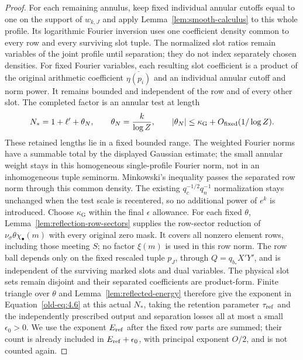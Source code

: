 \begin{proof}
For each remaining annulus, keep fixed individual annular cutoffs equal to
one on the support of $w_{k,J}$ and apply
Lemma~\ref{lem:smooth-calculus} to this whole profile.  Its logarithmic
Fourier inversion uses one coefficient density common to every row and
every surviving slot tuple.  The normalized slot ratios remain variables
of the joint profile until separation; they do not index separately
chosen densities.  For fixed Fourier variables, each resulting slot
coefficient is a product of the
original arithmetic coefficient $\overline{\eta(p_i)}$ and an individual
annular cutoff and norm power.  It remains bounded and independent of the
row and of every other slot.  The completed factor is an annular test at
length
\[
 N_*=1+\ell'+\theta_N,\qquad
 \theta_N=\frac{k}{\log Z},\qquad
 |\theta_N|\le\kappa_{\mathrm G}+O_{\rm fixed}(1/\log Z).
\]
These retained lengths lie in a fixed bounded range.  The weighted Fourier
norms have a summable total by the displayed Gaussian estimate; the small
annular weight stays in this homogeneous single-profile Fourier norm, not
in an inhomogeneous tuple seminorm.  Minkowski's inequality passes the
separated row norm through this common density.  The existing $q_c^{-1/2}q_n^{-1}$
normalization stays unchanged when the test scale is recentered, so no
additional power of $e^k$ is introduced.  Choose $\kappa_{\mathrm G}$
within the final $\epsilon$ allowance.  For each fixed $\theta$,
Lemma~\ref{lem:reflection-row-sectors} supplies the row-sector reduction of
$\nu_\sigma\theta\chi_\bullet(m)$ with every original zero mask.  It covers
all nonzero element rows, including those meeting $S$; no factor $\xi(m)$ is
used in this row norm.  The row ball depends only on the fixed rescaled tuple
$p_J$, through $Q=q_{b_*}X'Y'$, and is independent of the surviving marked
slots and dual variables.  The physical slot sets remain disjoint and their
separated coefficients are product-form.  Finite triangle over $\theta$ and
Lemma~\ref{lem:reflected-energy} therefore give the exponent in
Equation~\eqref{old-eq:4.6} at this actual $N_*$, taking the retention
parameter $\tau_{\rm ref}$ and the independently prescribed output
and separation losses all at most a small $\epsilon_0>0$.  We use
the exponent $E_{\rm ref}$ after the fixed row parts are summed;
their count is already included in $E_{\rm ref}+\epsilon_0$, with
principal exponent $O/2$, and is not counted again.


\end{proof}
